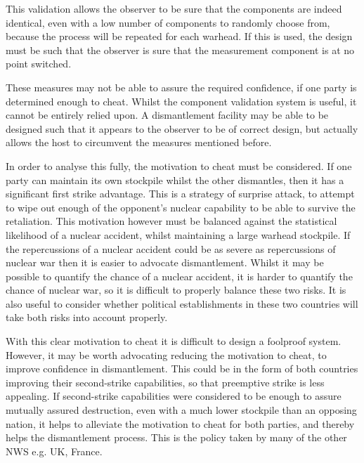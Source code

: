 \documentclass[twoside,titlepage,11pt,twocolumn,a4paper]{article}
\begin{document}
This validation allows the observer to be sure that the components are
indeed identical, even with a low number of components to randomly
choose from, because the process will be repeated for each warhead. If
this is used, the design must be such that the observer is sure that
the measurement component is at no point switched.

These measures may not be able to assure the required confidence, if
one party is determined enough to cheat. Whilst the component
validation system is useful, it cannot be entirely relied upon. A
dismantlement facility may be able to be designed such that it appears
to the observer to be of correct design, but actually allows the host
to circumvent the measures mentioned before.

In order to analyse this fully, the motivation to cheat must be
considered.  If one party can maintain its own stockpile whilst the
other dismantles, then it has a significant first strike
advantage. This is a strategy of surprise attack, to attempt to wipe
out enough of the opponent's nuclear capability to be able to survive
the retaliation. This motivation however must be balanced against the
statistical likelihood of a nuclear accident, whilst maintaining a
large warhead stockpile. If the repercussions of a nuclear accident
could be as severe as repercussions of nuclear war then it is easier
to advocate dismantlement. Whilst it may be possible to quantify the
chance of a nuclear accident, it is harder to quantify the chance of
nuclear war, so it is difficult to properly balance these two
risks. It is also useful to consider whether political establishments
in these two countries will take both risks into account properly.

With this clear motivation to cheat it is difficult to design a
foolproof system. However, it may be worth advocating reducing the
motivation to cheat, to improve confidence in dismantlement. This
could be in the form of both countries improving their second-strike
capabilities, so that preemptive strike is less appealing. If
second-strike capabilities were considered to be enough to assure
mutually assured destruction, even with a much lower stockpile than an
opposing nation, it helps to alleviate the motivation to cheat for
both parties, and thereby helps the dismantlement process. This is the
policy taken by many of the other NWS e.g. UK, France.
\end{document}
